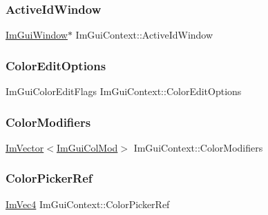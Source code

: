 \hypertarget{struct_im_gui_context_a95a35b5d82d3fdea28b71580dc6a9618}{}\label{struct_im_gui_context_a95a35b5d82d3fdea28b71580dc6a9618} 
\subsubsection{\texorpdfstring{Active\+Id\+Window}{ActiveIdWindow}}
{\footnotesize\ttfamily \hyperlink{struct_im_gui_window}{Im\+Gui\+Window}$\ast$ Im\+Gui\+Context\+::\+Active\+Id\+Window}

\hypertarget{struct_im_gui_context_a122394766b40cdb6cbd8a40fbe6ac680}{}\label{struct_im_gui_context_a122394766b40cdb6cbd8a40fbe6ac680} 
\subsubsection{\texorpdfstring{Color\+Edit\+Options}{ColorEditOptions}}
{\footnotesize\ttfamily Im\+Gui\+Color\+Edit\+Flags Im\+Gui\+Context\+::\+Color\+Edit\+Options}

\hypertarget{struct_im_gui_context_aeb58091b545cc794c99487b8e66daf43}{}\label{struct_im_gui_context_aeb58091b545cc794c99487b8e66daf43} 
\subsubsection{\texorpdfstring{Color\+Modifiers}{ColorModifiers}}
{\footnotesize\ttfamily \hyperlink{class_im_vector}{Im\+Vector}$<$\hyperlink{struct_im_gui_col_mod}{Im\+Gui\+Col\+Mod}$>$ Im\+Gui\+Context\+::\+Color\+Modifiers}

\hypertarget{struct_im_gui_context_ae3a119a9a71b31ede7ccc87447627b68}{}\label{struct_im_gui_context_ae3a119a9a71b31ede7ccc87447627b68} 
\subsubsection{\texorpdfstring{Color\+Picker\+Ref}{ColorPickerRef}}
{\footnotesize\ttfamily \hyperlink{struct_im_vec4}{Im\+Vec4} Im\+Gui\+Context\+::\+Color\+Picker\+Ref}

